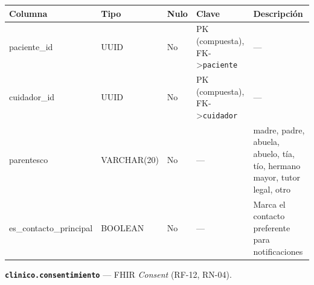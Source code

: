 \documentclass[11pt,a4paper]{article}
\begin{document}
{\small
\begin{longtable}[]{@{}
  >{\raggedright\arraybackslash}p{}
  >{\raggedright\arraybackslash}p{}
  >{\raggedright\arraybackslash}p{}
  >{\raggedright\arraybackslash}p{}
  >{\raggedright\arraybackslash}p{}@{}}
\toprule\noalign{}
\begin{minipage}[b]{\linewidth}\raggedright
Columna
\end{minipage} & \begin{minipage}[b]{\linewidth}\raggedright
Tipo
\end{minipage} & \begin{minipage}[b]{\linewidth}\raggedright
Nulo
\end{minipage} & \begin{minipage}[b]{\linewidth}\raggedright
Clave
\end{minipage} & \begin{minipage}[b]{\linewidth}\raggedright
Descripción
\end{minipage} \\
\midrule\noalign{}
\endhead
\bottomrule\noalign{}
\endlastfoot
paciente\_id & UUID & No & PK (compuesta), FK-\textgreater{}\texttt{paciente} & --- \\
cuidador\_id & UUID & No & PK (compuesta), FK-\textgreater{}\texttt{cuidador} & --- \\
parentesco & VARCHAR(20) & No & --- & madre, padre, abuela, abuelo, tía, tío, hermano mayor, tutor legal, otro \\
es\_contacto\_principal & BOOLEAN & No & --- & Marca el contacto preferente para notificaciones \\
\end{longtable}
}

\textbf{\texttt{clinico.consentimiento}} --- FHIR \emph{Consent} (RF-12, RN-04).
\end{document}
